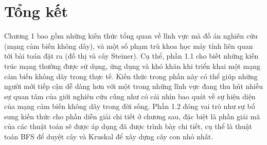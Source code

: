 \section{Tổng kết}
Chương 1 bao gồm những kiến thức tổng quan về lĩnh vực mà đồ án nghiên cứu (mạng cảm biến không dây), và một số phạm trù khoa học máy tính liên quan tới bài toán đặt ra (đồ thị và cây Steiner). Cụ thể, phần 1.1 cho biết những kiến trúc mạng thường được sử dụng, ứng dụng và khó khăn khi triển khai một mạng cảm biến không dây trong thực tế. Kiến thức trong phần này có thể giúp những người mới tiếp cận dễ dàng hơn với một trong những lĩnh vực đang thu hút nhiều sự quan tâm của giới nghiên cứu cũng như có cái nhìn bao quát về sự hiện diện của mạng cảm biến không dây trong đời sống. Phần 1.2 đóng vai trò như sự bổ sung kiến thức cho phần diễn giải chi tiết ở chương sau, đặc biệt là phần giải mã của các thuật toán sẽ được áp dụng đã được trình bày chi tiết, cụ thể là thuật toán BFS để duyệt cây và Kruskal để xây dựng cây con nhỏ nhất.